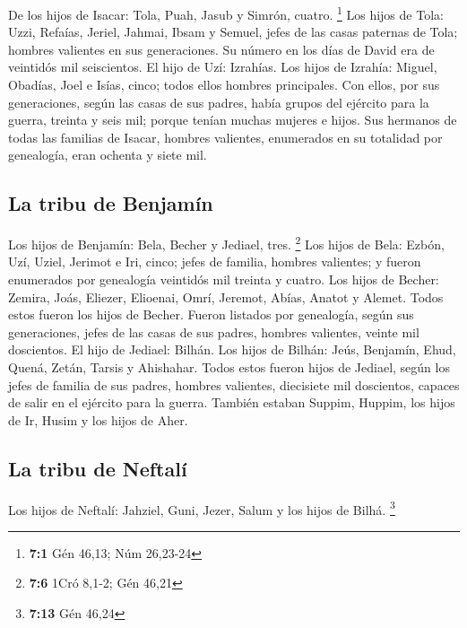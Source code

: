  De los hijos de Isacar: Tola, Puah, Jasub y Simrón,
cuatro. \footnote{\textbf{7:1} Gén 46,13; Núm 26,23-24} 
Los hijos de Tola: Uzzi, Refaías, Jeriel, Jahmai, Ibsam y Semuel, jefes
de las casas paternas de Tola; hombres valientes en sus generaciones. Su
número en los días de David era de veintidós mil seiscientos.
 El hijo de Uzí: Izrahías. Los hijos de Izrahía: Miguel,
Obadías, Joel e Isías, cinco; todos ellos hombres principales.
 Con ellos, por sus generaciones, según las casas de sus
padres, había grupos del ejército para la guerra, treinta y seis mil;
porque tenían muchas mujeres e hijos.  Sus hermanos de
todas las familias de Isacar, hombres valientes, enumerados en su
totalidad por genealogía, eran ochenta y siete mil.

\hypertarget{la-tribu-de-benjamuxedn}{%
\subsection{La tribu de Benjamín}\label{la-tribu-de-benjamuxedn}}

 Los hijos de Benjamín: Bela, Becher y Jediael, tres.
\footnote{\textbf{7:6} 1Cró 8,1-2; Gén 46,21}  Los hijos
de Bela: Ezbón, Uzí, Uziel, Jerimot e Iri, cinco; jefes de familia,
hombres valientes; y fueron enumerados por genealogía veintidós mil
treinta y cuatro.  Los hijos de Becher: Zemira, Joás,
Eliezer, Elioenai, Omrí, Jeremot, Abías, Anatot y Alemet. Todos estos
fueron los hijos de Becher.  Fueron listados por
genealogía, según sus generaciones, jefes de las casas de sus padres,
hombres valientes, veinte mil doscientos.  El hijo de
Jediael: Bilhán. Los hijos de Bilhán: Jeús, Benjamín, Ehud, Quená,
Zetán, Tarsis y Ahishahar.  Todos estos fueron hijos de
Jediael, según los jefes de familia de sus padres, hombres valientes,
diecisiete mil doscientos, capaces de salir en el ejército para la
guerra.  También estaban Suppim, Huppim, los hijos de Ir,
Husim y los hijos de Aher.

\hypertarget{la-tribu-de-neftaluxed}{%
\subsection{La tribu de Neftalí}\label{la-tribu-de-neftaluxed}}

 Los hijos de Neftalí: Jahziel, Guni, Jezer, Salum y los
hijos de Bilhá. \footnote{\textbf{7:13} Gén 46,24}

